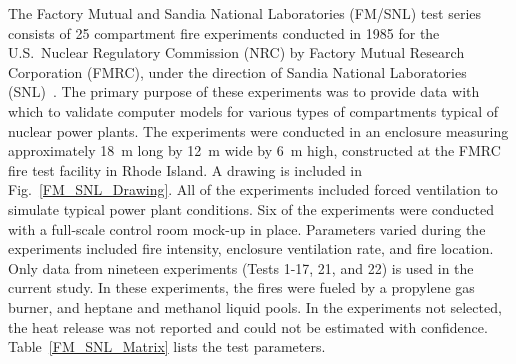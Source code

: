The Factory Mutual and Sandia National Laboratories (FM/SNL) test series consists of 25 compartment fire experiments conducted in 1985 for the U.S.~Nuclear Regulatory Commission (NRC) by Factory Mutual Research Corporation (FMRC), under the direction of Sandia National Laboratories (SNL)~\cite{Nowlen:NUREG4681,Nowlen:NUREG4527}. The primary purpose of these experiments was to provide data with which to validate computer models for various types of compartments typical of nuclear power plants. The experiments were conducted in an enclosure measuring approximately 18~m long by 12~m wide by 6~m high, constructed at the FMRC fire test facility in Rhode Island. A drawing is included in Fig.~\ref{FM_SNL_Drawing}. All of the experiments included forced ventilation to simulate typical power plant conditions. Six of the experiments were conducted with a full-scale control room mock-up in place. Parameters varied during the experiments included fire intensity, enclosure ventilation rate, and fire location. Only data from nineteen experiments (Tests 1-17, 21, and 22) is used in the current study. In these experiments, the fires were fueled by a propylene gas burner, and heptane and methanol liquid pools. In the experiments not selected, the heat release was not reported and could not be estimated with confidence. Table~\ref{FM_SNL_Matrix} lists the test parameters.

